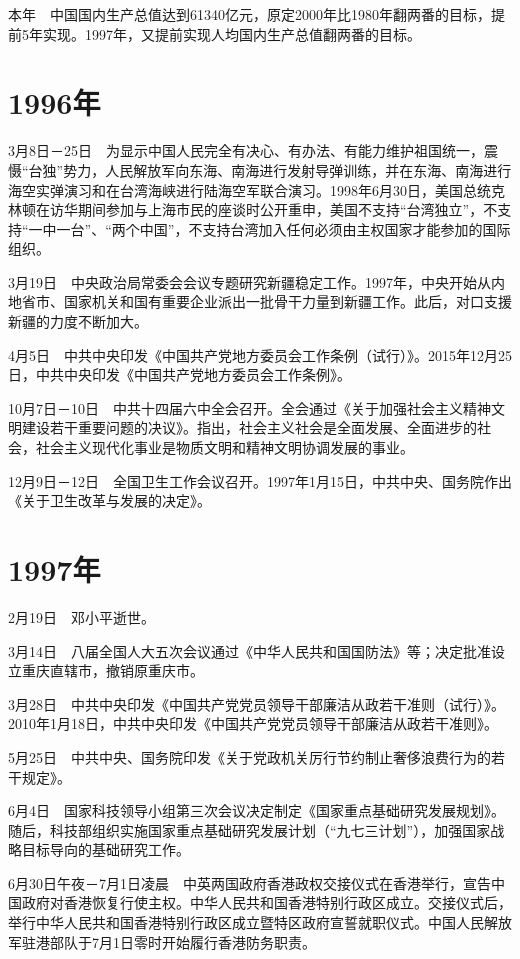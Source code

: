 \documentclass[10pt,a4paper,twocolumn]{book}
\begin{document}
本年　中国国内生产总值达到61340亿元，原定2000年比1980年翻两番的目标，提前5年实现。1997年，又提前实现人均国内生产总值翻两番的目标。

\section{1996年}

3月8日－25日　为显示中国人民完全有决心、有办法、有能力维护祖国统一，震慑“台独”势力，人民解放军向东海、南海进行发射导弹训练，并在东海、南海进行海空实弹演习和在台湾海峡进行陆海空军联合演习。1998年6月30日，美国总统克林顿在访华期间参加与上海市民的座谈时公开重申，美国不支持“台湾独立”，不支持“一中一台”、“两个中国”，不支持台湾加入任何必须由主权国家才能参加的国际组织。

3月19日　中央政治局常委会会议专题研究新疆稳定工作。1997年，中央开始从内地省市、国家机关和国有重要企业派出一批骨干力量到新疆工作。此后，对口支援新疆的力度不断加大。

4月5日　中共中央印发《中国共产党地方委员会工作条例（试行）》。2015年12月25日，中共中央印发《中国共产党地方委员会工作条例》。

10月7日－10日　中共十四届六中全会召开。全会通过《关于加强社会主义精神文明建设若干重要问题的决议》。指出，社会主义社会是全面发展、全面进步的社会，社会主义现代化事业是物质文明和精神文明协调发展的事业。

12月9日－12日　全国卫生工作会议召开。1997年1月15日，中共中央、国务院作出《关于卫生改革与发展的决定》。

\section{1997年}

2月19日　邓小平逝世。

3月14日　八届全国人大五次会议通过《中华人民共和国国防法》等；决定批准设立重庆直辖市，撤销原重庆市。

3月28日　中共中央印发《中国共产党党员领导干部廉洁从政若干准则（试行）》。2010年1月18日，中共中央印发《中国共产党党员领导干部廉洁从政若干准则》。

5月25日　中共中央、国务院印发《关于党政机关厉行节约制止奢侈浪费行为的若干规定》。

6月4日　国家科技领导小组第三次会议决定制定《国家重点基础研究发展规划》。随后，科技部组织实施国家重点基础研究发展计划（“九七三计划”），加强国家战略目标导向的基础研究工作。

6月30日午夜－7月1日凌晨　中英两国政府香港政权交接仪式在香港举行，宣告中国政府对香港恢复行使主权。中华人民共和国香港特别行政区成立。交接仪式后，举行中华人民共和国香港特别行政区成立暨特区政府宣誓就职仪式。中国人民解放军驻港部队于7月1日零时开始履行香港防务职责。
\end{document}
